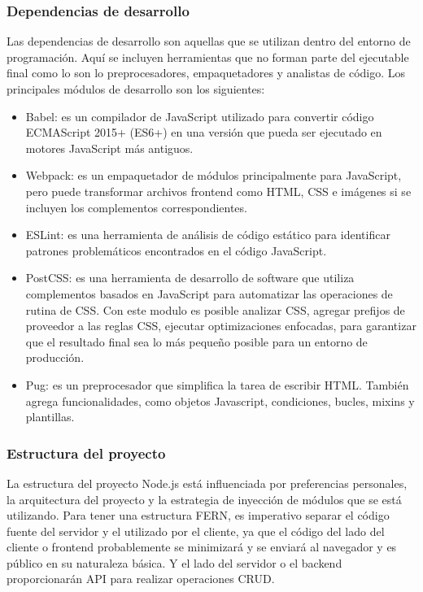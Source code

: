 \subsubsection{Dependencias de desarrollo}
Las dependencias de desarrollo son aquellas que se utilizan dentro del entorno de programación. Aquí se incluyen herramientas que no forman parte del ejecutable final como lo son lo preprocesadores, empaquetadores y analistas de código. Los principales módulos de desarrollo son los siguientes:
\begin{itemize}
  \item Babel: es un compilador de JavaScript utilizado para convertir código ECMAScript 2015+ (ES6+) en una versión que pueda ser ejecutado en motores JavaScript más antiguos.
  \item Webpack: es un empaquetador de módulos principalmente para JavaScript, pero puede transformar archivos \gls{frontend} como HTML, CSS e imágenes si se incluyen los complementos correspondientes.
  \item ESLint: es una herramienta de análisis de código estático para identificar patrones problemáticos encontrados en el código JavaScript.
  \item PostCSS: es una herramienta de desarrollo de software que utiliza complementos basados en JavaScript para automatizar las operaciones de rutina de CSS. Con este modulo es posible analizar CSS, agregar prefijos de proveedor a las reglas CSS, ejecutar optimizaciones enfocadas, para garantizar que el resultado final sea lo más pequeño posible para un entorno de producción.
  \item Pug: es un preprocesador que simplifica la tarea de escribir HTML. También agrega funcionalidades, como objetos Javascript, condiciones, bucles, mixins y plantillas.
\end{itemize}

\subsubsection{Estructura del proyecto}
La estructura del proyecto Node.js está influenciada por preferencias personales, la arquitectura del proyecto y la estrategia de inyección de módulos que se está utilizando. Para tener una estructura FERN, es imperativo separar el código fuente del servidor y el utilizado por el cliente, ya que el código del lado del cliente o \gls{frontend} probablemente se minimizará y se enviará al navegador y es público en su naturaleza básica. Y el lado del servidor o el \gls{backend} proporcionarán API para realizar operaciones CRUD.

